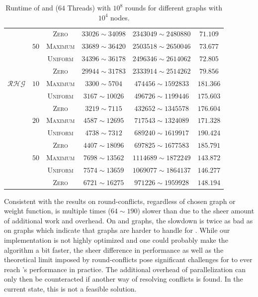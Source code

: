 \begin{table}[!tb]
\begin{center}
\begin{tabular}{c|c|c|c|c|c}
            &  & \textsc{Zero} & $33026 \sim 34098$ & $2343049 \sim 2480880$ & $71.109$ \\
            & $50$ & \textsc{Maximum} & $33689 \sim 36420$ & $2503518 \sim 2650046$ & $73.677$ \\
            &  & \textsc{Uniform} & $34396 \sim 36178$ & $2496346 \sim 2614062$ & $72.805$ \\
            &  & \textsc{Zero} & $29944 \sim 31783$ & $2333914 \sim 2514262$ & $79.856$ \\
           $\mathcal{RHG}$ & $10$ & \textsc{Maximum} & $3300 \sim 5704$ & $474456 \sim 1592833$ & $181.366$ \\
            &  & \textsc{Uniform} & $3167 \sim 10026$ & $496726 \sim 1199446$ & $175.603$ \\
            &  & \textsc{Zero} & $3219 \sim 7115$ & $432652 \sim 1345578$ & $176.604$ \\
            & $20$ & \textsc{Maximum} & $4587 \sim 12695$ & $717543 \sim 1324089$ & $171.328$ \\
            &  & \textsc{Uniform} & $4738 \sim 7312$ & $689240 \sim 1619917$ & $190.424$ \\
            &  & \textsc{Zero} & $4407 \sim 18096$ & $697825 \sim 1677583$ & $185.791$ \\
            & $50$ & \textsc{Maximum} & $7698 \sim 13562$ & $1114689 \sim 1872249$ & $143.872$ \\
            &  & \textsc{Uniform} & $7574 \sim 13659$ & $1069077 \sim 1864137$ & $146.277$ \\
            &  & \textsc{Zero} & $6721 \sim 16275$ & $971226 \sim 1959928$ & $148.194$ \\
        \end{tabular}
    \end{center}

    \caption{Runtime of \algbp and \algbt ($64$ Threads) with $10^8$ rounds for different graphs with $10^4$ nodes.}
    \label{tab:par_batching_perf}
\end{table}

Consistent with the results on round-conflicts, regardless of chosen graph or weight function, \algbt is multiple times ($64\sim190$) slower than \algbp due to the sheer amount of additional work and overhead.
On \rhg and \dsf graphs, the slowdown is twice as bad as on \gnp graphs which indicate that  graphs are harder to handle for \algbt.
While our implementation is not highly optimized and one could probably make the algorithm a bit faster, the sheer difference in performance as well as the theoretical limit imposed by round-conflicts pose significant challenges for \algbt to ever reach \algbp's performance in practice.
The additional overhead of parallelization can only then be counteracted if another way of resolving conflicts is found.
In the current state, this is not a feasible solution.



